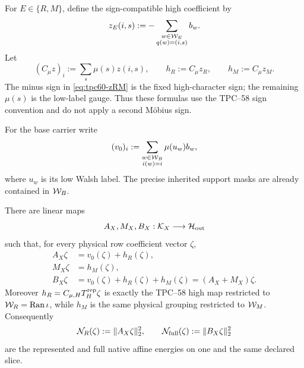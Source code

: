 For \(E\in\{R,M\}\), define the sign-compatible high coefficient by
\begin{equation}
 z_E(i,s)
 :=-\sum_{\substack{w\in\mathcal W_E\\q(w)=(i,s)}}b_w.
 \label{eq:tpc60-zRM}
\end{equation}
Let
\begin{equation}
 (C_\mu z)_i:=\sum_s\mu(s)z(i,s),
 \qquad
 h_R:=C_\mu z_R,
 \qquad h_M:=C_\mu z_M.
 \label{eq:tpc60-hRM}
\end{equation}
The minus sign in \eqref{eq:tpc60-zRM} is the fixed high-character sign;
the remaining \(\mu(s)\) is the low-label gauge.  Thus these formulas use
the TPC--58 sign convention and do not apply a second M\"obius sign.

For the base carrier write
\begin{equation}
 (v_0)_i
 :=\sum_{\substack{w\in\mathcal W_B\\i(w)=i}}
       \mu(u_w)b_w,
 \label{eq:tpc60-base-vector}
\end{equation}
where \(u_w\) is its low Walsh label.  The precise inherited support masks
are already contained in \(\mathcal W_B\).

\begin{proposition}
\label{prop:tpc60-literal-three-map}
There are linear maps
\begin{equation}
 A_X,M_X,B_X:\mathcal K_X\longrightarrow\mathcal H_{\rm out}
 \label{eq:tpc60-three-map-domains}
\end{equation}
such that, for every physical row coefficient vector \(\zeta\),
\begin{align}
 A_X\zeta&=v_0(\zeta)+h_R(\zeta),
 \label{eq:tpc60-represented-map}\\
 M_X\zeta&=h_M(\zeta),
 \label{eq:tpc60-missing-map}\\
 B_X\zeta&=v_0(\zeta)+h_R(\zeta)+h_M(\zeta)
            =(A_X+M_X)\zeta.
 \label{eq:tpc60-full-map}
\end{align}
Moreover \(h_R=C_{\mu,H}T_H^{\rm rep}\zeta\) is exactly the TPC--58 high
map restricted to \(\mathcal W_R=\operatorname{Ran}\iota\), while \(h_M\) is the same physical
grouping restricted to \(\mathcal W_M\).  Consequently
\begin{equation}
 \mathcal N_R(\zeta):=\|A_X\zeta\|_2^2,
 \qquad
 \mathcal N_{\rm full}(\zeta):=\|B_X\zeta\|_2^2
 \label{eq:tpc60-represented-full-energies}
\end{equation}
are the represented and full native affine energies on one and the same
declared slice.
\end{proposition}

